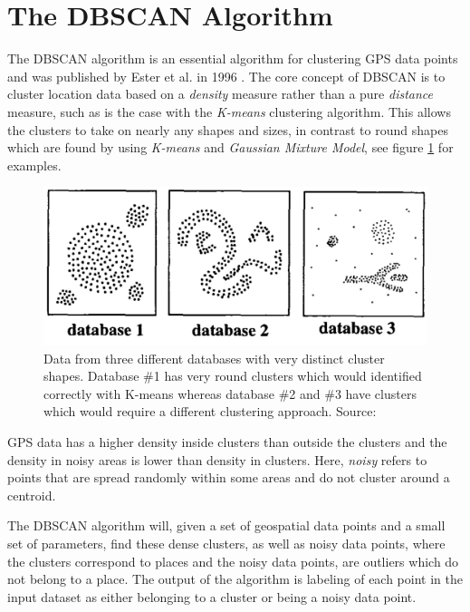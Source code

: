 \section{The DBSCAN Algorithm}
The DBSCAN algorithm is an essential algorithm for clustering GPS data points and was published by Ester et al. in 1996 \cite{density-based-1996}. The core concept of DBSCAN is to cluster location data based on a \textit{density} measure rather than a pure \textit{distance} measure, such as is the case with the \textit{K-means} clustering algorithm. This allows the clusters to take on nearly any shapes and sizes, in contrast to round shapes which are found by using \textit{K-means} and \textit{Gaussian Mixture Model}, see figure \ref{fig:dbscan_shapes} for examples.

\begin{figure}
    \centering
    \includegraphics[width=\textwidth]{images/dbscan-clusters.png}
    \caption{Data from three different databases with very distinct cluster shapes. Database \#1 has very round clusters which would identified correctly with K-means whereas database \#2 and \#3 have clusters which would require a different clustering approach. Source: \cite{density-based-1996}}
    \label{fig:dbscan_shapes}
\end{figure}

GPS data has a higher density inside clusters than outside the clusters and the density in noisy areas is lower than density in clusters. Here, \textit{noisy} refers to points that are spread randomly within some areas and do not cluster around a centroid.

The DBSCAN algorithm will, given a set of geospatial data points and a small set of parameters, find these dense clusters, as well as noisy data points, where the clusters correspond to places and the noisy data points, are outliers which do not belong to a place. The output of the algorithm is labeling of each point in the input dataset as either belonging to a cluster or being a noisy data point.

